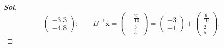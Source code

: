 \begin{enumerate}
\begin{proof}[\normalfont\color{magenta}\bfseries Sol]
				\[
				\begin{pmatrix}
						-3.3\\
						-4.8
					\end{pmatrix}:
				\qquad
				B^{-1}\mathbf x
				=
				\begin{pmatrix}
						-\frac{21}{10}\\[2pt]
						-\frac35
					\end{pmatrix}
				=
				\begin{pmatrix}
						-3\\
						-1
					\end{pmatrix}
				+
				\begin{pmatrix}
						\frac9{10}\\[2pt]
						\frac25
					\end{pmatrix}.
				\]
	\end{proof}


\end{enumerate}

